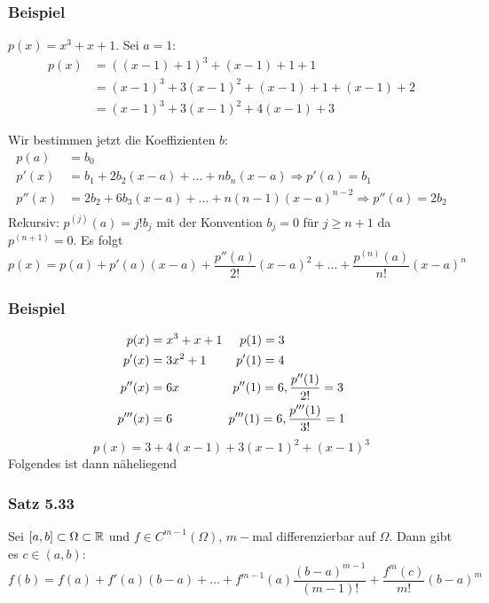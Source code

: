 \subsubsection*{Beispiel}
$p(x)=x^3+x+1$. Sei $a=1$:
\begin{align*}
p(x)&=\left( \left( x-1\right)+1\right)^3 +\left( x-1\right)+1+1\\
&=\left( x-1\right)^3+3\left( x-1\right)^2+\left( x-1\right)+1+\left( x-1\right)+2\\
&=\left( x-1\right)^3+3\left( x-1\right)^2+4\left( x-1\right)+3
\end{align*}

Wir bestimmen jetzt die Koeffizienten $b$:
\begin{align*}
p(a)&=b_0\\
p'(x)&=b_1+2b_2(x-a)+\dots+nb_n(x-a)\Rightarrow p'(a)=b_1\\
p''(x)&=2b_2+6b_3(x-a)+\dots+n(n-1)(x-a)^{n-2}\Rightarrow p''(a)=2b_2\\
\end{align*}
Rekursiv: $p^{(j)}(a)=j!b_j$ mit der Konvention $b_j=0$ für $j\geq n+1$ da $p^{(n+1)}=0$. Es folgt 
\[p(x)=p(a)+p'(a)(x-a)+\frac{p''(a)}{2!}(x-a)^2+\dots+\frac{p^{(n)}(a)}{n!}\left( x-a\right)^n\]

\subsubsection*{Beispiel}
\begin{align*}
p(x)&=x^3+x+1 \hspace{5mm}p(1)=3\\
p'(x)&=3x^2+1\hspace{8.5mm} p'(1)=4\\
p''(x)&=6x \hspace{15.2mm} p''(1)=6, \frac{p''(1)}{2!}=3\\
p'''(x)&=6 \hspace{16mm} p'''(1)=6, \frac{p'''(1)}{3!}=1\\
\end{align*}
\[p(x)=3+4(x-1)+3(x-1)^2+(x-1)^3\]
Folgendes ist dann näheliegend

\subsubsection*{Satz 5.33}
Sei $\lbrack a,b\rbrack\subset \Omega\subset\mathbb{R}$ und $f\in C^{m-1}\left( \Omega\right)$, $m-$mal differenzierbar auf $\Omega$. Dann gibt es $c\in(a,b)$:
\[f(b)=f(a)+f'(a)(b-a)+\dots+f^{m-1}(a)\frac{(b-a)^{m-1}}{(m-1)!}+\frac{f^m(c)}{m!}(b-a)^m\]

